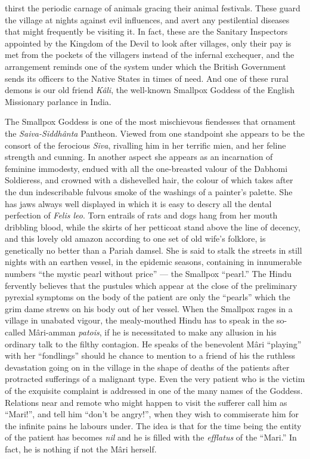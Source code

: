 \documentclass[a4paper, 12pt, oneside, english]{article}
\begin{document}
thirst the periodic carnage of animals gracing their animal festivals. These guard the village at nights against evil influences, and avert any pestilential diseases that might frequently be visiting it. In fact, these are the Sanitary Inspectors appointed by the Kingdom of the Devil to look after villages, only their pay is met from the pockets of the villagers instead of the infernal exchequer, and the arrangement reminds one of the system under which the British Government sends its officers to the Native States in times of need. And one of these rural demons is our old friend \emph{Kâli}, the well-known Smallpox Goddess of the English Missionary parlance in India.

The Smallpox Goddess is one of the most mischievous fiendesses that ornament the \emph{Saiva-Siddhânta} Pantheon. Viewed from one standpoint she appears to be the consort of the ferocious \emph{Siva}, rivalling him in her terrific mien, and her feline strength and cunning. In another aspect she appears as an incarnation of feminine immodesty, endued with all the one-breasted valour of the Dabhomi Soldieress, and crowned with a dishevelled hair, the colour of which takes after the dun indescribable fulvous smoke of the washings of a painter's palette. She has jaws always well displayed in which it is easy to descry all the dental perfection of \emph{Felis leo}. Torn entrails of rats and dogs hang from her mouth dribbling blood, while the skirts of her petticoat stand above the line of decency, and this lovely old amazon according to one set of old wife's folklore, is genetically no better than a Pariah damsel. She is said to stalk the streets in still nights with an earthen vessel, in the epidemic seasons, containing in innumerable numbers ``the mystic pearl without price'' --- the Smallpox ``pearl.'' The Hindu fervently believes that the pustules which appear at the close of the preliminary pyrexial symptoms on the body of the patient are only the ``pearls'' which the grim dame strews on his body out of her vessel. When the Smallpox rages in a village in unabated vigour, the mealy-mouthed Hindu has to speak in the so-called Mâri-amman \emph{patois}, if he is necessitated to make any allusion in his ordinary talk to the filthy contagion. He speaks of the benevolent Mâri ``playing'' with her ``fondlings'' should he chance to mention to a friend of his the ruthless devastation going on in the village in the shape of deaths of the patients after protracted sufferings of a malignant type. Even the very patient who is the victim of the exquisite complaint is addressed in one of the many names of the Goddess. Relations near and remote who might happen to visit the sufferer call him as ``Mari!'', and tell him ``don't be angry!'', when they wish to commiserate him for the infinite pains he labours under. The idea is that for the time being the entity of the patient has becomes \emph{nil} and he is filled with the \emph{efflatus} of the ``Mari.'' In fact, he is nothing if not the Mâri herself.
\end{document}
